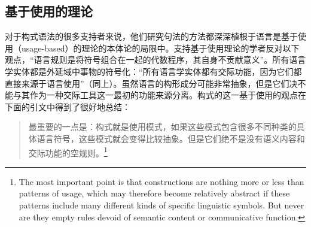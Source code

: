 \subsection{基于使用的理论}\label{usage-based-sec}
    对于构式语法的很多支持者来说，他们研究句法的方法都深深植根于语言是基于使用（usage-based）的理论\citep{Langacker87a-u, Goldberg95a,Croft2001a, Tomasello2003a}的本体论的局限中。支持基于使用理论的学者反对以下观点，“语言规则是将符号组合在一起的代数程序，其自身不贡献意义”\citep[]{Tomasello2003a}。所有语言学实体都是外延域中事物的符号化：“所有语言学实体都有交际功能，因为它们都直接来源于语言使用”（同上）。虽然语言的构形成分可能非常抽象，但是它们决不能与其作为一种交际工具这一最初的功能来源分离。构式的这一基于使用的观点在下面的引文中得到了很好地总结：
\begin{quotation}
最重要的一点是：构式就是使用模式，如果这些模式包含很多不同种类的具体语言符号，这些模式就会变得比较抽象。但是它们绝不是没有语义内容和交际功能的空规则。\citep[]{Tomasello2003a}\footnote{%
The most important point is that constructions are nothing more or less than patterns of usage,
which may therefore become relatively abstract if these patterns include many different kinds of
specific linguistic symbols.  But never are they empty rules devoid of semantic content or
communicative function.
}
\end{quotation}


